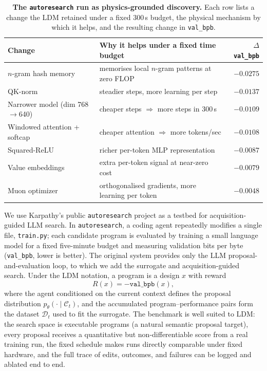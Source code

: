 \begin{table}[ht]
\centering
\footnotesize
\begin{tabular}{@{}llr@{}}
\toprule
Change & Why it helps under a fixed time budget & $\Delta$\texttt{val\_bpb} \\
\midrule
$n$-gram hash memory             & memorises local $n$-gram patterns at zero FLOP     & $-0.0275$ \\
QK-norm                          & steadier steps, more learning per step             & $-0.0137$ \\
Narrower model (dim 768$\to$640) & cheaper steps $\Rightarrow$ more steps in 300\,s   & $-0.0109$ \\
Windowed attention + softcap     & cheaper attention $\Rightarrow$ more tokens/sec    & $-0.0108$ \\
Squared-ReLU                     & richer per-token MLP representation                & $-0.0087$ \\
Value embeddings                 & extra per-token signal at near-zero cost           & $-0.0079$ \\
Muon optimizer                   & orthogonalised gradients, more learning per token  & $-0.0048$ \\
\bottomrule
\end{tabular}
\caption{\textbf{The \texttt{autoresearch} run as physics-grounded discovery.} Each row lists a change the LDM retained under a fixed 300\,s budget, the physical mechanism by which it helps, and the resulting change in \texttt{val\_bpb}.}
    \label{tab:autoresearch-discovery}
\end{table}

We use Karpathy's public \texttt{autoresearch} project \citep{karpathy2026autoresearch} as a testbed for acquisition-guided LLM search. In \texttt{autoresearch}, a coding agent repeatedly modifies a single file, \texttt{train.py}; each candidate program is evaluated by training a small language model for a fixed five-minute budget and measuring validation bits per byte (\texttt{val\_bpb}, lower is better). The original system provides only the LLM proposal-and-evaluation loop, to which we add the surrogate and acquisition-guided search. Under the LDM notation, a program is a design $x$ with reward
\[
R(x)=-\texttt{val\_bpb}(x),
\]
where the agent conditioned on the current context defines the proposal distribution $p_\theta(\cdot\mid\mathcal C_t)$, and the accumulated program--performance pairs form the dataset $\mathcal D_t$ used to fit the surrogate. The benchmark is well suited to LDM: the search space is executable programs (a natural semantic proposal target), every proposal receives a quantitative but non-differentiable score from a real training run, the fixed schedule makes runs directly comparable under fixed hardware, and the full trace of edits, outcomes, and failures can be logged and ablated end to end.

